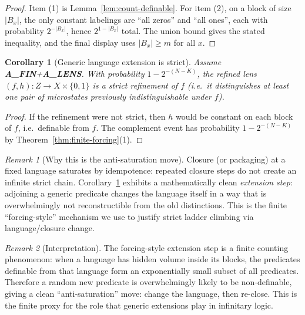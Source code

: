 \documentclass[11pt]{article}
\newtheorem{corollary}{Corollary}
\theoremstyle{remark}
\newtheorem{remark}{Remark}
\begin{document}
\begin{proof}
Item (1) is Lemma~\ref{lem:count-definable}.
For item (2), on a block of size $|B_x|$, the only constant labelings are “all zeros” and “all ones”, each with probability $2^{-|B_x|}$, hence $2^{1-|B_x|}$ total.
The union bound gives the stated inequality, and the final display uses $|B_x|\ge m$ for all $x$.
\end{proof}

\begin{corollary}[Generic language extension is strict]\label{cor:strict-language-extension}
Assume \textbf{A\_FIN}+\textbf{A\_LENS}.
With probability $1-2^{-(N-K)}$, the refined lens $(f,h):Z\to X\times\{0,1\}$ is a \emph{strict} refinement of $f$ (i.e.\ it distinguishes at least one pair of microstates previously indistinguishable under $f$).
\end{corollary}

\begin{proof}
If the refinement were not strict, then $h$ would be constant on each block of $f$, i.e.\ definable from $f$.
The complement event has probability $1-2^{-(N-K)}$ by Theorem~\ref{thm:finite-forcing}(1).
\end{proof}

\begin{remark}[Why this is the anti-saturation move]
Closure (or packaging) at a fixed language saturates by idempotence: repeated closure steps do not create an infinite strict chain.
Corollary~\ref{cor:strict-language-extension} exhibits a mathematically clean \emph{extension step}: adjoining a generic predicate changes the language itself in a way that is overwhelmingly not reconstructible from the old distinctions.
This is the finite “forcing-style” mechanism we use to justify strict ladder climbing via language/closure change.
\end{remark}

\begin{remark}[Interpretation]
The forcing-style extension step is a finite counting phenomenon: when a language has hidden volume inside its blocks, the predicates definable from that language form an exponentially small subset of all predicates.
Therefore a random new predicate is overwhelmingly likely to be non-definable, giving a clean ``anti-saturation'' move: change the language, then re-close.
This is the finite proxy for the role that generic extensions play in infinitary logic.
\end{remark}

\end{document}

